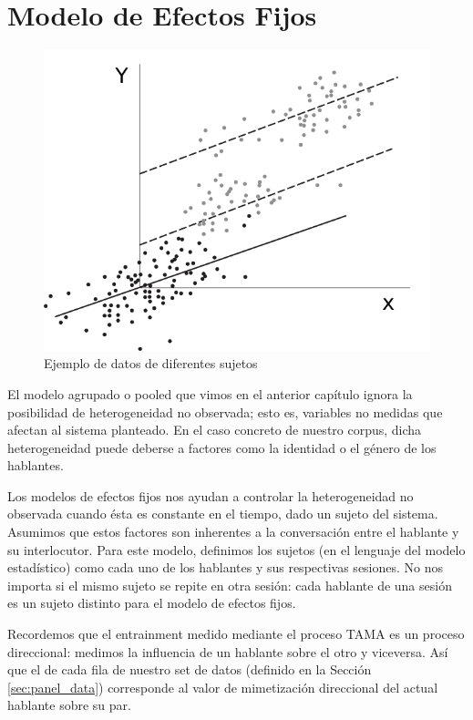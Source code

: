 \section{Modelo de Efectos Fijos}

\begin{figure}[t]
\centering
\includegraphics[scale=1]{images/fixed_effects_example.pdf}
\caption{Ejemplo de datos de diferentes sujetos}
\label{fig:efectos_fijo}
\end{figure}



\newcommand{\slopeestim}[1] { $\estslope \sim #1$ }

El modelo agrupado o pooled que vimos en el anterior capítulo ignora la posibilidad de heterogeneidad no observada; esto es, variables no medidas que afectan al sistema planteado. En el caso concreto de nuestro corpus, dicha heterogeneidad puede deberse a factores como la identidad o el género de los hablantes.

Los modelos de efectos fijos nos ayudan a controlar la heterogeneidad no observada cuando ésta es constante en el tiempo, dado un sujeto del sistema. Asumimos que estos factores son inherentes a la conversación entre el hablante y su interlocutor. Para este modelo, definimos los sujetos (en el lenguaje del modelo estadístico) como cada uno de los hablantes y sus respectivas sesiones. No nos importa si el mismo sujeto se repite en otra sesión: cada hablante de una sesión es un sujeto distinto para el modelo de efectos fijos.

Recordemos que el entrainment medido mediante el proceso TAMA es un proceso direccional: medimos la influencia de un hablante sobre el otro y viceversa. Así que el \entrainment de cada fila de nuestro set de datos (definido en la Sección \ref{sec:panel_data}) corresponde al valor de mimetización direccional del actual hablante sobre su par.


